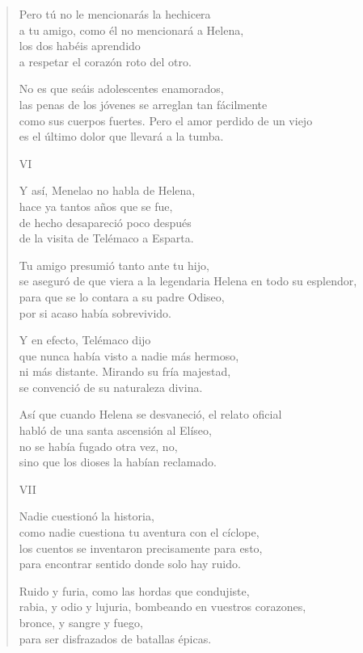 \documentclass[11pt,a4paper]{article}
\begin{document}
\begin{verse}
Pero tú no le mencionarás la hechicera\\
a tu amigo, como él no mencionará a Helena,\\
los dos habéis aprendido\\
a respetar el corazón roto del otro.

No es que seáis adolescentes enamorados,\\
las penas de los jóvenes se arreglan tan fácilmente\\
como sus cuerpos fuertes. Pero el amor perdido de un viejo\\
es el último dolor que llevará a la tumba.

VI

Y así, Menelao no habla de Helena,\\
hace ya tantos años que se fue,\\
de hecho desapareció poco después\\
de la visita de Telémaco a Esparta.

Tu amigo presumió tanto ante tu hijo,\\
se aseguró de que viera a la legendaria Helena en todo su esplendor,\\
para que se lo contara a su padre Odiseo,\\
por si acaso había sobrevivido.

Y en efecto, Telémaco dijo\\
que nunca había visto a nadie más hermoso,\\
ni más distante. Mirando su fría majestad,\\
se convenció de su naturaleza divina.

Así que cuando Helena se desvaneció, el relato oficial\\
habló de una santa ascensión al Elíseo,\\
no se había fugado otra vez, no,\\
sino que los dioses la habían reclamado.

VII

Nadie cuestionó la historia,\\
como nadie cuestiona tu aventura con el cíclope,\\
los cuentos se inventaron precisamente para esto,\\
para encontrar sentido donde solo hay ruido.

Ruido y furia, como las hordas que condujiste,\\
rabia, y odio y lujuria, bombeando en vuestros corazones,\\
bronce, y sangre y fuego,\\
para ser disfrazados de batallas épicas.


\end{verse}
\end{document}
